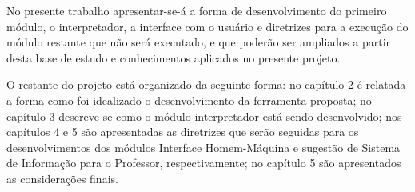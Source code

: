 
No presente trabalho apresentar-se-á a forma de desenvolvimento do primeiro
módulo, o interpretador, a interface com o usuário e diretrizes para a
execução do módulo restante que não será executado, e que poderão ser ampliados
a partir desta base de estudo e conhecimentos aplicados no presente projeto.

O restante do projeto está organizado da seguinte forma: no capítulo 2 é
relatada a forma como foi idealizado o desenvolvimento da ferramenta proposta;
no capítulo 3 descreve-se como o módulo interpretador está sendo desenvolvido;
nos capítulos 4 e 5 são apresentadas as diretrizes que serão seguidas para os
desenvolvimentos dos módulos Interface Homem-Máquina e sugestão de Sistema de
Informação para o Professor, respectivamente; no capítulo 5 são apresentados as
considerações finais.

